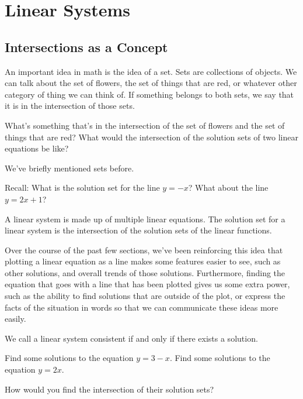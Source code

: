 \chapter{Linear Systems}
\section{Intersections as a Concept}

An important idea in math is the idea of a set.  Sets are collections of objects.  We can talk about the set of flowers, the set of things that are red, or whatever other category of thing we can think of.  If something belongs to both sets, we say that it is in the intersection of those sets.

\begin{prblm}
What's something that's in the intersection of the set of flowers and the set of things that are red?
What would the intersection of the solution sets of two linear equations be like?
\vspace{5cm}
\end{prblm}

We've briefly mentioned sets before.

Recall: What is the solution set for the line $y=-x$? What about the line $y=2x+1$?


\begin{defn}
A linear system is made up of multiple linear equations. The solution set for a linear system is the intersection of the solution sets of the linear functions. 
\end{defn}

Over the course of the past few sections, we've been reinforcing this idea that plotting a linear equation as a line makes some features easier to see, such as other solutions, and overall trends of those solutions.  Furthermore, finding the equation that goes with a line that has been plotted gives us some extra power, such as the ability to find solutions that are outside of the plot, or express the facts of the situation in words so that we can communicate these ideas more easily.

\begin{defn}
We call a linear system consistent if and only if there exists a solution.	
\end{defn}

\begin{prblm}
Find some solutions to the equation $y = 3 - x$.
Find some solutions to the equation $y = 2x$.

How would you find the intersection of their solution sets?

\vspace{5.5cm}
\end{prblm}

